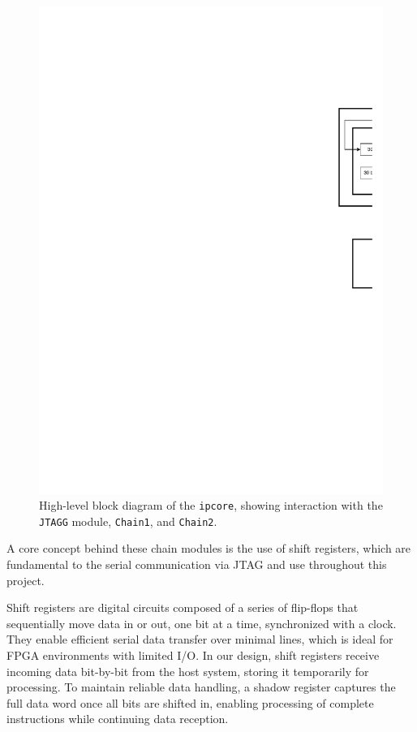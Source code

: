 \documentclass[a4paper,11pt,oneside]{report}
\begin{document}
\begin{figure}[H]
    \centering
    \includegraphics[width=0.85\linewidth]{figures/IPCORE_Design.pdf}
    \caption{High-level block diagram of the \texttt{ipcore}, showing interaction with the \texttt{JTAGG} module, \texttt{Chain1}, and \texttt{Chain2}.}
    \label{fig:ipcore_block}
\end{figure}

A core concept behind these chain modules is the use of shift registers, which are fundamental to the serial communication via JTAG and use throughout this project.

Shift registers are digital circuits composed of a series of flip-flops that sequentially move data in or out, one bit at a time, synchronized with a clock.  
They enable efficient serial data transfer over minimal lines, which is ideal for FPGA environments with limited I/O.  
In our design, shift registers receive incoming data bit-by-bit from the host system, storing it temporarily for processing.  
To maintain reliable data handling, a shadow register captures the full data word once all bits are shifted in, enabling processing of complete instructions while continuing data reception.
  
\end{document}
